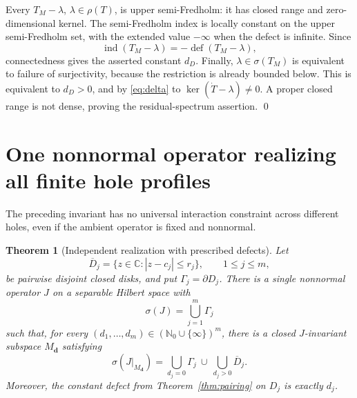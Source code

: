 \documentclass[11pt]{article}
\newtheorem{theorem}{Theorem}
\newcommand{\C}{\mathbb C}
\newcommand{\N}{\mathbb N}
\newcommand{\ind}{\operatorname{ind}}
\begin{document}
Every $T_M-\lambda$, $\lambda\in\rho(T)$, is upper semi-Fredholm: it has
closed range and zero-dimensional kernel.  The semi-Fredholm index is locally
constant on the upper semi-Fredholm set, with the extended value $-\infty$
when the defect is infinite.  Since
\[
 \ind(T_M-\lambda)=-\operatorname{def}(T_M-\lambda),
\]
connectedness gives the asserted constant $d_D$.  Finally,
$\lambda\in\sigma(T_M)$ is equivalent to failure of surjectivity, because the
restriction is already bounded below.  This is equivalent to $d_D>0$, and by
\eqref{eq:delta} to $\ker(\dot T-\lambda)\ne0$.  A proper closed range is not
dense, proving the residual-spectrum assertion. \qed

\section{One nonnormal operator realizing all finite hole profiles}

The preceding invariant has no universal interaction constraint across
different holes, even if the ambient operator is fixed and nonnormal.

\begin{theorem}[Independent realization with prescribed defects]\label{thm:realize}
Let
\[
 \overline D_j=\{z\in\C:|z-c_j|\le r_j\},\qquad 1\le j\le m,
\]
be pairwise disjoint closed disks, and put $\Gamma_j=\partial D_j$.  There is
a single nonnormal operator $J$ on a separable Hilbert space with
\[
 \sigma(J)=\bigcup_{j=1}^m\Gamma_j
\]
such that, for every $(d_1,\ldots,d_m)\in(\N_0\cup\{\infty\})^m$, there is a
closed $J$-invariant subspace $M_{\boldsymbol d}$ satisfying
\begin{equation}\label{eq:spectrumprofile}
 \sigma(J|_{M_{\boldsymbol d}})
 =\bigcup_{d_j=0}\Gamma_j\ \cup\
   \bigcup_{d_j>0}\overline D_j.
\end{equation}
Moreover, the constant defect from Theorem~\ref{thm:pairing} on $D_j$ is
exactly $d_j$.
\end{theorem}
\end{document}
